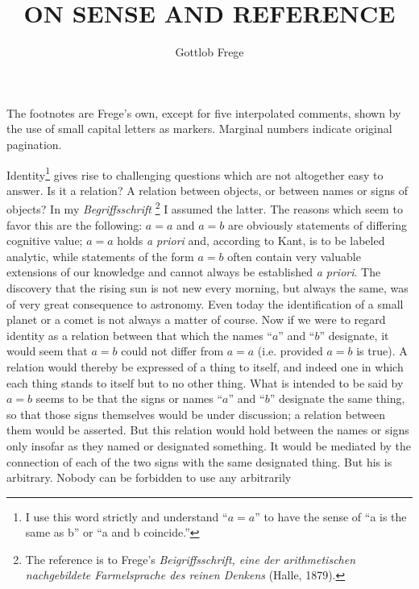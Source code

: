 \documentclass[twoside,12pt,a4paper]{article}
\newcommand{\footnoteAlph}[2][\thefootnote]{%
  \renewcommand{\thefootnote}{\Alph{footnote}}%
  \footnote[#1]{#2}%
  \renewcommand{\thefootnote}{\arabic{footnote}}}
\begin{document}
The footnotes are Frege's own, except for five interpolated comments,
shown by the use of small capital letters as markers. Marginal numbers
indicate original pagination.


\newpage
\lfoot{}
\rfoot{}
\title{\vspace{-2em}ON SENSE AND REFERENCE}
\author{Gottlob Frege}
\date{\vspace{-2em}}
\maketitle

Identity\footnote[1]{I use this word strictly and understand ``$a=a$''
  to have the sense of ``a is the same as b'' or ``a and b
  coincide.''} gives rise to challenging questions which are not
altogether easy to answer. Is it a relation? A relation between
objects, or between names or signs of objects? In my {\it
  Begriffsschrift}\footnoteAlph[1]{The reference is to Frege's {\it
    Beigriffsschrift, eine der arithmetischen nachgebildete
    Farmelsprache des reinen Denkens} (Halle, 1879).} I assumed the
latter. The reasons which seem to favor this are the following: $a=a$
and $a=b$ are obviously statements of differing cognitive value; $a=a$
holds {\it a priori} and, according to Kant, is to be labeled
analytic, while statements of the form $a=b$ often contain very
valuable extensions of our knowledge and cannot always be established
{\it a priori}. The discovery that the rising sun is not new every
morning, but always the same, was of very great consequence to
astronomy. Even today the identification of a small planet or a comet
is not always a matter of course. 
Now if we were to regard identity as a relation between that which the
names ``$a$'' and ``$b$'' designate, it would seem that $a=b$ could
not differ from $a=a$ (i.e. provided $a=b$ is true). A relation would
thereby be expressed of a thing to itself, and indeed one in which
each thing stands to itself but to no other thing. What is intended to
be said by $a=b$ seems to be that the signs or names ``$a$'' and
``$b$'' designate the same thing, so that those signs themselves would
be under discussion; a relation between them would be asserted. But
this relation would hold between the names or signs only insofar as
they named or designated something. It would be mediated by the
connection of each of the two signs with the same designated thing.
But his is arbitrary. Nobody can be forbidden to use any arbitrarily
\end{document}

